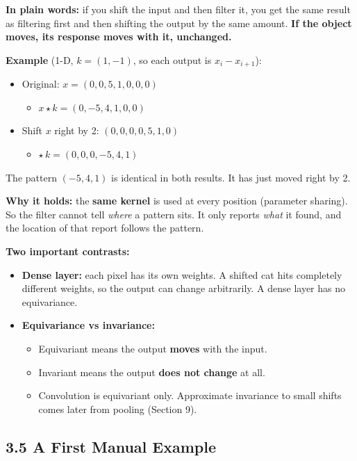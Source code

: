 \textbf{In plain words:} if you shift the input and then filter it, you get the same result as filtering first and then shifting the output by the same amount. \textbf{If the object moves, its response moves with it, unchanged.}

\textbf{Example} (1-D, $k = (1, -1)$, so each output is $x_i - x_{i+1}$):
\begin{itemize}
  \item Original: $x = (0, 0, 5, 1, 0, 0, 0)$
  \begin{itemize}
    \item $x \star k = (0, -5, 4, 1, 0, 0)$
  \end{itemize}
  \item Shift $x$ right by 2: $(0, 0, 0, 0, 5, 1, 0)$
  \begin{itemize}
    \item $\star\, k = (0, 0, 0, -5, 4, 1)$
  \end{itemize}
\end{itemize}
The pattern $(-5, 4, 1)$ is identical in both results. It has just moved right by 2.

\textbf{Why it holds:} the \textbf{same kernel} is used at every position (parameter sharing). So the filter cannot tell \emph{where} a pattern sits. It only reports \emph{what} it found, and the location of that report follows the pattern.

\textbf{Two important contrasts:}
\begin{itemize}
  \item \textbf{Dense layer:} each pixel has its own weights. A shifted cat hits completely different weights, so the output can change arbitrarily. A dense layer has no equivariance.
  \item \textbf{Equivariance vs invariance:}
  \begin{itemize}
    \item Equivariant means the output \textbf{moves} with the input.
    \item Invariant means the output \textbf{does not change} at all.
    \item Convolution is equivariant only. Approximate invariance to small shifts comes later from pooling (Section 9).
  \end{itemize}
\end{itemize}


\subsection*{3.5 A First Manual Example}


